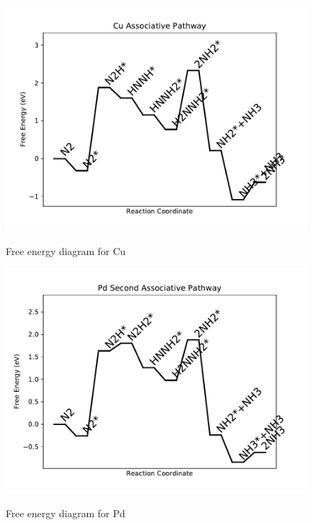 \documentclass[journal=jacsat,manuscript=article]{achemso}
\begin{document}
\begin{figure}
\includegraphics[width=1\linewidth]{data/plots/Cu_associative.pdf}
\label{fig:Cu_associative}
\caption{Free energy diagram for Cu}
\end{figure}

\newpage
\begin{figure}
\includegraphics[width=1\linewidth]{data/plots/Pd_associative_2.pdf}
\label{fig:Pd_associative_2}
\caption{Free energy diagram for Pd}
\end{figure}
\end{document}
